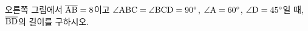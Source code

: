 \noindent\begin{minipage}[t]{0.58\linewidth}\vspace{0pt}\raggedright 오른쪽 그림에서 $\overline{\mathrm{AB}}=8$이고 $\angle\mathrm{ABC}=\angle\mathrm{BCD}=90^\circ$, $\angle\mathrm{A}=60^\circ$, $\angle\mathrm{D}=45^\circ$일 때, $\overline{\mathrm{BD}}$의 길이를 구하시오.\end{minipage}\hfill\begin{minipage}[t]{0.4\linewidth}\vspace{0pt}\centering \resizebox{\ifdim\width>\linewidth\linewidth\else\width\fi}{!}{}\end{minipage}\par
